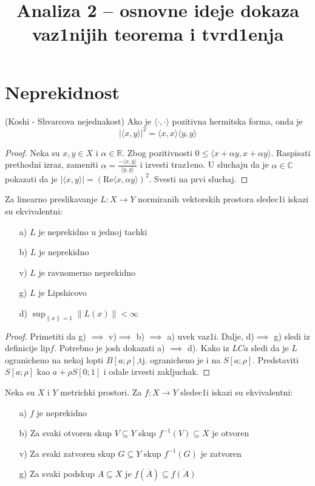 \documentclass[a4paper,12pt]{article}
\title{\textbf{Analiza 2 -- osnovne ideje dokaza vaz1nijih teorema i tvrd1enja }}
\date{}
\newcommand{\RR}{\mathbb{R}}
\newcommand{\CC}{\mathbb{C}}
\newcommand{\psj}{\subseteq}
\newcommand{\norm}[1]{\left\lVert#1\right\rVert}
\begin{document}
\maketitle

\section{Neprekidnost}

\begin{tvr}
(Koshi - Shvarcova nejednakost) Ako je $\langle \cdot, \cdot \rangle$ pozitivna hermit\-ska forma, onda je 
\[{|\langle x, y \rangle |}^2 = \langle x, x \rangle \langle y, y \rangle\]
\end{tvr}
\begin{proof}
Neka su $x, y \in X$ i $\alpha \in \RR$. Zbog pozitivnosti $0 \leq \langle x + \alpha y, x + \alpha y \rangle$. Raspisati prethodni izraz, zameniti $\alpha = \frac{- \langle x, y \rangle }{\langle y, y \rangle}$ i izvesti traz1eno. U sluchaju da je $\alpha \in \CC$ pokazati da je $|\langle x, y \rangle | = {( \mathrm{Re} \langle x, \alpha y \rangle)}^2$. Svesti na prvi sluchaj.
\end{proof}

\begin{tvr}
Za linearno preslikavanje $L:X \to Y$ normiranih vektorskih prostora sledec1i iskazi su ekvivalentni:
\begin{itemize}
\item[a)] $L$ je neprekidno u jednoj tachki
\item[b)] $L$ je neprekidno
\item[v)] $L$ je ravnomerno neprekidno
\item[g)] $L$ je Lipshicovo
\item[d)] $\sup_{\norm{x} = 1} \norm{L(x)} < \infty$
\end{itemize}
\end{tvr}
\begin{proof}
Primetiti da g) $\implies$ v)$ \implies$ b) $ \implies$ a) uvek vaz1i. Dalje, d)$ \implies$ g) sledi iz definicije $\mathrm{lip} f$. Potrebno je josh dokazati a) $\implies$ d). Kako iz $LCa$ sledi da je $L$ ogranicheno na nekoj lopti $B[a; \rho]$,tj. ogranicheno je i na $S[a; \rho]$. Predstaviti $S[a;\rho]$ kao $a + \rho S[0;1]$ i odale izvesti zakljuchak.
\end{proof}

\begin{tma}
Neka su $X$ i $Y$ metrichki prostori. Za $f:X \to Y$ sledec1i iskazi su ekvivalentni:
\begin{itemize}
\item[a)] $f$ je neprekidno
\item[b)] Za svaki otvoren skup $V \psj Y$ skup $f^{-1}(V) \psj X$ je otvoren
\item[v)] Za svaki zatvoren skup $G \psj Y$ skup $f^{-1}(G)$ je zatvoren
\item[g)] Za svaki podskup $A \psj X$ je $f(\overline{A}) \psj \overline{f(A)}$
\end{itemize}
\end{tma}
\end{document}
